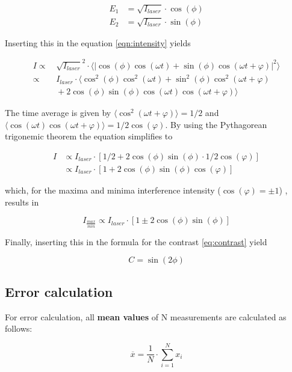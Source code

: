 \begin{align*}
	E_1 & =\sqrt{I_{laser}} \cdot \cos(\phi ) \\
	E_2 & =\sqrt{I_{laser}} \cdot \sin(\phi )
\end{align*}

Inserting this in the equation \eqref{eqn:intensity} yields

\begin{align*}
	I \varpropto & \, \sqrt{I_{laser}}^2 \cdot \langle |\cos(\phi ) \cos(\omega t) + \sin(\phi )\cos(\omega t+\varphi ) |^2 \rangle \\
	  \varpropto & \, I_{laser} \cdot \langle \cos^2(\phi )\cos^2(\omega t) + \sin^2(\phi )\cos^2(\omega t+\varphi ) \\
	   & \, +2\cos(\phi )\sin(\phi )\cos(\omega t)\cos(\omega t+\varphi ) \rangle
\end{align*}

The time average is given by $\langle \cos^2(\omega t+\varphi) \rangle=1/2$ and $\langle \cos(\omega t)\cos(\omega t+\varphi) \rangle=1/2\cos(\varphi)$.
By using the Pythagorean trigonemic theorem the equation simplifies to

\begin{align*}
	I&\varpropto I_{laser}\cdot [1/2 + 2\cos(\phi )\sin(\phi )\cdot 1/2\cos(\varphi)]\\
	 &\varpropto I_{laser}\cdot [1 + 2\cos(\phi )\sin(\phi )\cos(\varphi)]
\end{align*}

which, for the maxima and minima interference intensity ($\cos(\varphi)=\pm1$) , results in

\begin{equation}
	I_{\frac{max}{min}}\varpropto I_{laser}\cdot [1\pm 2\cos(\phi )\sin(\phi )]
\end{equation}

Finally, inserting this in the formula for the contrast \eqref{eq:contrast}
yield

\begin{equation}
	C=\sin(2\phi )
	\label{eq:contrast_phi}
\end{equation}

\subsection{Error calculation}
For error calculation, all \textbf{mean values} of N measurements are
calculated as follows:

\begin{equation}
	\overline{x} = \frac{1}{N} \cdot \sum_{i=1}^N x_i
	\label{eqn:Mittelwert}
\end{equation}

